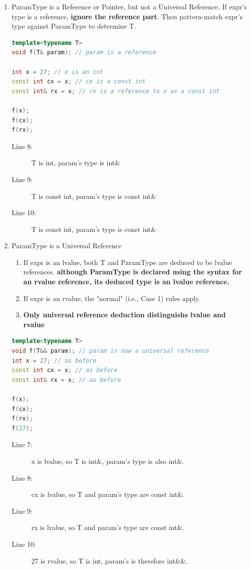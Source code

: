 \documentclass[a4paper,11pt,twoside]{book}
\begin{document}
\begin{enumerate}
	
	\item ParamType is a Reference or Pointer, but not a Universal Reference. If expr's type is a reference, \textbf{ignore the reference part}. Then pattern-match expr's type against ParamType to determine T.
\begin{lstlisting}[frame=single, language=c++]
template<typename T>
void f(T& param); // param is a reference
	
int x = 27; // x is an int
const int cx = x; // cx is a const int
const int& rx = x; // rx is a reference to x as a const int
	
f(x); 
f(cx);  
f(rx); 
\end{lstlisting}
\begin{description}
	\item[Line 8:]  T is int, param's type is int\&
	\item[Line 9:]  T is const int, param's type is const int\&
	\item[Line 10:] T is const int, param's type is const int\&
\end{description}
	
	\item ParamType is a Universal Reference
	
	\begin{enumerate}
		\item If expr is an lvalue, both T and ParamType are deduced to be lvalue references.
		\textbf{although ParamType is declared using the syntax for an rvalue reference, its deduced type is an lvalue reference.}
		
		\item If expr is an rvalue, the "normal" (i.e., Case 1) rules apply.
		
		\item \textbf{Only universal reference deduction distinguishs lvalue and rvalue}
	\end{enumerate}
	
\begin{lstlisting}[frame=single, language=c++]
template<typename T>
void f(T&& param); // param is now a universal reference
int x = 27; // as before
const int cx = x; // as before
const int& rx = x; // as before
	
f(x); 
f(cx); 
f(rx); 
f(27); 
\end{lstlisting}
\begin{description}
	\item[Line 7:]  x is lvalue, so T is int\&, param's type is also int\&.
	\item[Line 8:]  cx is lvalue, so T  and param's type are const int\&.
	\item[Line 9:] rx is lvalue, so T  and param's type are const int\&.
	\item[Line 10:] 27 is rvalue, so T is int, param's is therefore int\&\&.
\end{description}
	

\end{enumerate}
\end{document}
